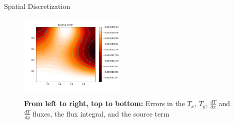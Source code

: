 \documentclass{article}
\begin{document}
\begin{section}{Spatial Discretization}
\begin{figure}[h]
{    \includegraphics[width=0.45\textwidth]{figs/source_err.png}
  }
  \label{space_errs}
  \caption{{\bf From left to right, top to bottom:} Errors in the $T_x$, $T_y$,
    $\frac{dT}{dx}$ and $\frac{dT}{dy}$ fluxes, the flux integral, and the source term}
\end{figure}
\end{section}
\end{document}
